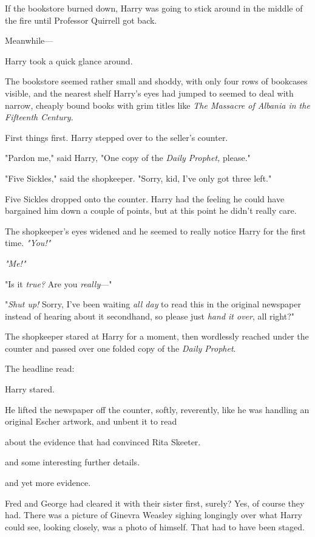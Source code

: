 If the bookstore burned down, Harry was going to stick around in the middle of
the fire until Professor Quirrell got back.

Meanwhile\mbox{---}

Harry took a quick glance around.

The bookstore seemed rather small and shoddy, with only four rows of bookcases
visible, and the nearest shelf Harry's eyes had jumped to seemed to deal with
narrow, cheaply bound books with grim titles like \emph{The Massacre of Albania
in the Fifteenth Century.}

First things first. Harry stepped over to the seller's counter.

"Pardon me," said Harry, "One copy of the \emph{Daily Prophet,} please."

"Five Sickles," said the shopkeeper. "Sorry, kid, I've only got three left."

Five Sickles dropped onto the counter. Harry had the feeling he could have
bargained him down a couple of points, but at this point he didn't really care.

The shopkeeper's eyes widened and he seemed to really notice Harry for the
first time. \emph{"You!"}

\emph{"Me!"}

"Is it \emph{true?} Are you \emph{really}\mbox{---}"

"\emph{Shut up!} Sorry, I've been waiting \emph{all day} to read this in the
original newspaper instead of hearing about it secondhand, so please just
\emph{hand it over}, all right?"

The shopkeeper stared at Harry for a moment, then wordlessly reached under the
counter and passed over one folded copy of the \emph{Daily Prophet}.

The headline read:


Harry stared.

He lifted the newspaper off the counter, softly, reverently, like he was
handling an original Escher artwork, and unbent it to read{\el}

{\el} about the evidence that had convinced Rita Skeeter.

{\el} and some interesting further details.

{\el} and yet more evidence.

Fred and George had cleared it with their sister first, surely? Yes, of course
they had. There was a picture of Ginevra Weasley sighing longingly over what
Harry could see, looking closely, was a photo of himself. That had to have been
staged.

